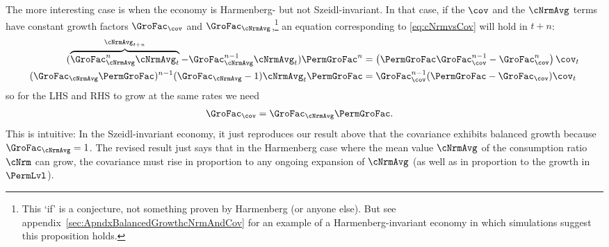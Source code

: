 \documentclass[BufferStockTheory]{subfiles}
\begin{document}
The more interesting case is when the economy is Harmenberg- but not Szeidl-invariant.  In that case, if the $\cov$ and the $\cNrmAvg$ terms have constant growth factors $\GroFac_{\cov}$ and $\GroFac_{\cNrmAvg}$,\footnote{This `if' is a conjecture, not something proven by Harmenberg (or anyone else).  But see appendix~\ref{sec:ApndxBalancedGrowthcNrmAndCov} for an example of a Harmenberg-invariant economy in which simulations suggest this proposition holds.} an equation corresponding to \eqref{eq:cNrmvsCov} will hold in $t+n$:
\begin{equation} \label{eq:aNrmGrovsCovGronm1}
  \begin{split}
    (\overbrace{\GroFac_{\cNrmAvg}^{n}\cNrmAvg_{t}}^{\cNrmAvg_{t+n}}-\GroFac^{n-1}_{\cNrmAvg}\cNrmAvg_{t})\PermGroFac^{n} & = \left(\PermGroFac\GroFac_{\cov}^{n-1} -\GroFac_{\cov}^{n}\right)\cov_{t}
    \\ (\GroFac_{\cNrmAvg}\PermGroFac)^{n-1} (\GroFac_{\cNrmAvg}-1)\cNrmAvg_{t}\PermGroFac & = \GroFac_{\cov}^{n-1}(\PermGroFac - \GroFac_{\cov}) \cov_{t}
  \end{split}
\end{equation}
so for the LHS and RHS to grow at the same rates we need
\begin{align}
  \GroFac_{\cov}  & = \GroFac_{\cNrmAvg}\PermGroFac \label{eq:aNrmGrovscovGro}.
\end{align}
This is intuitive:  In the Szeidl-invariant economy, it just reproduces our result above that the covariance exhibits balanced growth because $\GroFac_{\cNrmAvg}=1$.  The revised result just says that in the Harmenberg case where the mean value $\cNrmAvg$ of the consumption ratio $\cNrm$ can grow, the covariance must rise in proportion to any ongoing expansion of $\cNrmAvg$ (as well as in proportion to the growth in $\PermLvl$).
\end{document}
